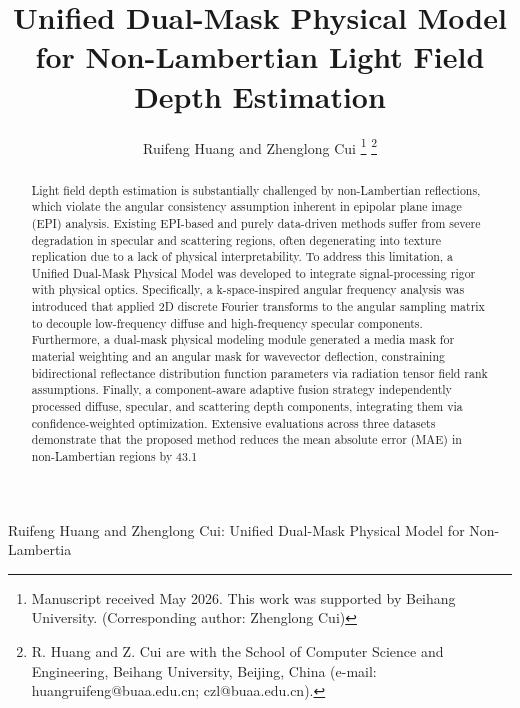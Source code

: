 \documentclass[lettersize,journal]{IEEEtran}
\begin{document}
\title{Unified Dual-Mask Physical Model for Non-Lambertian Light Field Depth Estimation}

\author{Ruifeng Huang and Zhenglong Cui
\thanks{Manuscript received May 2026. This work was supported by Beihang University. (Corresponding author: Zhenglong Cui)}
\thanks{R. Huang and Z. Cui are with the School of Computer Science and Engineering, Beihang University, Beijing, China (e-mail: huangruifeng@buaa.edu.cn; czl@buaa.edu.cn).}}

%
{Ruifeng Huang and Zhenglong Cui: Unified Dual-Mask Physical Model for Non-Lambertia}

\maketitle

\begin{abstract}
Light field depth estimation is substantially challenged by non-Lambertian reflections, which violate the angular consistency assumption inherent in epipolar plane image (EPI) analysis. Existing EPI-based and purely data-driven methods suffer from severe degradation in specular and scattering regions, often degenerating into texture replication due to a lack of physical interpretability. To address this limitation, a Unified Dual-Mask Physical Model was developed to integrate signal-processing rigor with physical optics. Specifically, a k-space-inspired angular frequency analysis was introduced that applied 2D discrete Fourier transforms to the angular sampling matrix to decouple low-frequency diffuse and high-frequency specular components. Furthermore, a dual-mask physical modeling module generated a media mask for material weighting and an angular mask for wavevector deflection, constraining bidirectional reflectance distribution function parameters via radiation tensor field rank assumptions. Finally, a component-aware adaptive fusion strategy independently processed diffuse, specular, and scattering depth components, integrating them via confidence-weighted optimization. Extensive evaluations across three datasets demonstrate that the proposed method reduces the mean absolute error (MAE) in non-Lambertian regions by 43.1%
\end{abstract}
\end{document}
